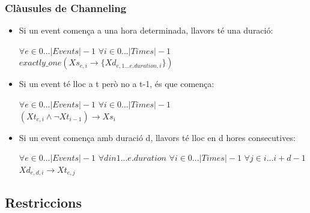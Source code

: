 \documentclass[11pt]{beamer}
\begin{document}
  \begin{frame}
  \frametitle{Clàusules de Channeling}  

  \begin{itemize}
    \item Si un event comença a una hora determinada, llavors té una duració: 
  \begin{center} $\forall e \in 0 ... |Events|-1$ $\forall i \in 0 ... |Times|-1$ \\$exactly\_one(Xs_{e,i} \rightarrow \{Xd_{e,1 ... e.duration,i}\})$\end{center}
    \item Si un event té lloc a t però no a t-1, és que comença: 
  \begin{center} 
  $\forall e \in 0 ... |Events|-1$ $\forall i \in 0 ... |Times|-1$ \\$(Xt_{e,i} \land \neg Xt_{i-1}) \rightarrow Xs_i$ \end{center}
    \item Si un event comença amb duració d, llavors té lloc en d hores consecutives: 
    \begin{center} 
      $\forall e \in 0 ... |Events|-1$ $\forall d in 1 ... e.duration$ $\forall i \in 0 ... |Times|-1$ $\forall j \in i ... i+d-1$ \\
      $Xd_{e,d,i} \rightarrow Xt_{e,j}$    
    \end{center}
  \end{itemize}

  \end{frame}

  \subsection{Restriccions}
\end{document}
